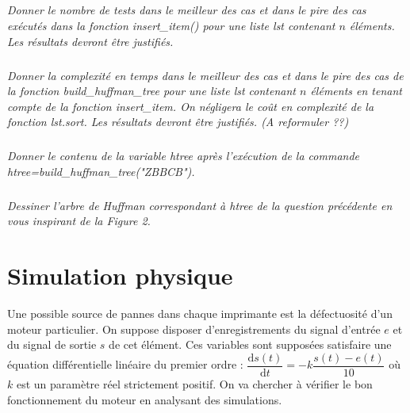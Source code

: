 \documentclass[10pt]{article}
\newif\ifprof
\begin{document}
\else
\fi

\subparagraph{}
\textit{Donner le nombre de tests dans le meilleur des cas et dans le pire des cas exécutés dans
la fonction \textsf{insert\_item()} pour une liste \textsf{lst} contenant $n$ éléments. Les résultats devront être justifiés.}
\ifprof
\begin{corrige}
Dans le meilleur des cas, la fonction réalise un seul test. 

Dans le pire des cas, $n$ tests sont réalisés. 
\end{corrige}

\else
\fi


\subparagraph{}
\textit{Donner la complexité en temps dans le meilleur des cas et dans le pire des cas de la
fonction \textsf{build\_huffman\_tree} pour une liste \textsf{lst} contenant $n$ éléments en tenant compte de la fonction \textsf{insert\_item}. On négligera le coût en complexité de la fonction \textsf{lst.sort}. Les résultats devront être justifiés. (A reformuler ??)}
\ifprof
\begin{corrige}
Complexité quadratique ?
\end{corrige}

\else
\fi




\subparagraph{}
\textit{Donner le contenu de la variable \textsf{htree} après l'exécution de la commande
\textsf{htree=build\_huffman\_tree("ZBBCB")}.}
\ifprof
\begin{corrige}
\textsf{[[('C', 1), ('Z', 1), ['C', 'Z'], 2], ('B', 3), ['C', 'Z', 'B'], 5]}
\end{corrige}

\else
\fi



\subparagraph{}
\textit{Dessiner l'arbre de Huffman correspondant à \textsf{htree} de la question précédente en vous inspirant de la Figure 2.}
\ifprof
\begin{corrige}

\end{corrige}

\else
\fi

\section{Simulation physique}
Une possible source de pannes dans chaque imprimante est la défectuosité d'un moteur
particulier. On suppose disposer d'enregistrements du signal d'entrée $e$ et du signal de sortie
$s$ de cet élément. Ces variables sont supposées satisfaire une équation différentielle linéaire du
premier ordre : $\dfrac{\text{d}s(t)}{\text{d}t} = -k \dfrac{s(t)-e(t)}{10}$ où $k$ est un paramètre réel strictement positif. On va chercher à vérifier le bon fonctionnement
du moteur en analysant des simulations.
\end{document}
